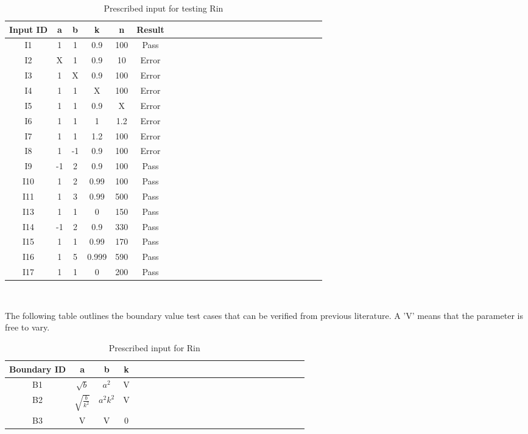 \documentclass[12pt, titlepage]{article}
\begin{document}
\begin{table}[h!]
	\centering
	\begin{tabular}{|c|c|c|c|c|c|c|c|c|c|c|c|c|c|c|c|c|c|c|c|c|c|c|c|}
		\hline        
		Input ID& a& b & k & n& Result \\
		\hline
		I1     &1 &1 &0.9 &100 & Pass \\ \hline
		I2    &X &1 &0.9 &10 & Error \\ \hline
		I3    &1 &X &0.9 &100 & Error\\ \hline 
		I4    &1 &1 &X &100 &Error \\ \hline 
		I5     &1 &1 &0.9 &X &Error \\ \hline
		I6    &1 &1 &1 & 1.2& Error\\ \hline
		I7    &1 &1 &1.2 & 100&Error\\ \hline 
		I8    &1 &-1 &0.9 &100& Error \\ \hline
		I9     &-1 &2 &0.9 &100 & Pass \\ \hline
		I10    &1 &2 &0.99 &100 & Pass\\ \hline
		I11    &1 &3 &0.99 &500 & Pass \\ \hline 
		I13   &1 &1 &0 &150 & Pass  \\ \hline
		I14     &-1 &2 &0.9 &330 & Pass \\ \hline
		I15    &1 &1 &0.99 &170 & Pass\\ \hline
		I16    &1 &5 &0.999 &590 & Pass \\ \hline 
		I17   &1 &1 &0 &200 & Pass  \\ 
		\hline
	\end{tabular}\\
	\caption{Prescribed input for testing Rin}
	\label{Table:D_1}
\end{table} 

The following table outlines the boundary value test cases that can be verified 
from previous literature. A 'V' means that the parameter is free to vary.
\begin{table}[h!]
	\centering
	\begin{tabular}{|c|c|c|c|c|c|c|c|c|c|c|c|c|c|c|c|c|c|c|c|c|c|c|c|}
		\hline        
		Boundary ID& a& b& k  \\
		\hline
		B1     &$\sqrt{b}$ &$a^{2}$ &V    \\ \hline
		B2    &$\sqrt{\frac{b}{k^{2}}}$ &$a^{2}k^{2}$ &V   \\ \hline
		B3    &V &V &0  \\ 
		\hline
	\end{tabular}\\
	\caption{Prescribed input for Rin}
	\label{Table:D_2}
\end{table} 
\end{document}
